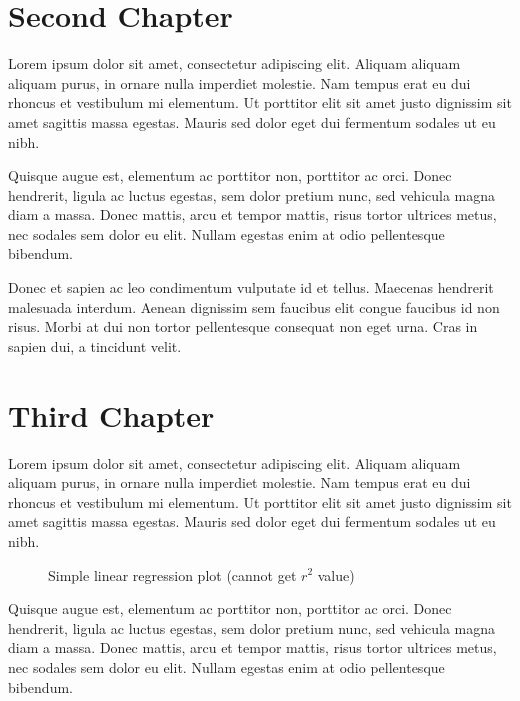 \chapter{Second Chapter}

Lorem ipsum dolor sit amet, consectetur adipiscing elit. Aliquam aliquam aliquam purus, in ornare nulla imperdiet molestie. Nam tempus erat eu dui rhoncus et vestibulum mi elementum. Ut porttitor elit sit amet justo dignissim sit amet sagittis massa egestas. Mauris sed dolor eget dui fermentum sodales ut eu nibh. 

Quisque augue est, elementum ac porttitor non, porttitor ac orci. Donec hendrerit, ligula ac luctus egestas, sem dolor pretium nunc, sed vehicula magna diam a massa. Donec mattis, arcu et tempor mattis, risus tortor ultrices metus, nec sodales sem dolor eu elit. Nullam egestas enim at odio pellentesque bibendum. 

Donec et sapien ac leo condimentum vulputate id et tellus. Maecenas hendrerit malesuada interdum. Aenean dignissim sem faucibus elit congue faucibus id non risus. Morbi at dui non tortor pellentesque consequat non eget urna. Cras in sapien dui, a tincidunt velit.

\chapter{Third Chapter}

Lorem ipsum dolor sit amet, consectetur adipiscing elit. Aliquam aliquam aliquam purus, in ornare nulla imperdiet molestie. Nam tempus erat eu dui rhoncus et vestibulum mi elementum. Ut porttitor elit sit amet justo dignissim sit amet sagittis massa egestas. Mauris sed dolor eget dui fermentum sodales ut eu nibh.
\begin{figure}[htbp]
  \centering
\label{fig:stdplot}
\caption{Simple linear regression plot (cannot get $r^2$ value)}
\end{figure}
Quisque augue est, elementum ac porttitor non, porttitor ac orci. Donec hendrerit, ligula ac luctus egestas, sem dolor pretium nunc, sed vehicula magna diam a massa. Donec mattis, arcu et tempor mattis, risus tortor ultrices metus, nec sodales sem dolor eu elit. Nullam egestas enim at odio pellentesque bibendum. 

